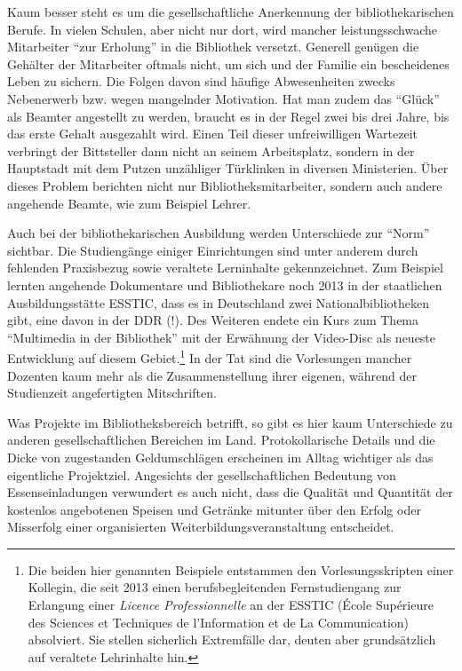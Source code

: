 \documentclass[a4paper,
fontsize=11pt,
oneside,
numbers=noperiodatend,
parskip=half-,
bibliography=totoc,
final
]{scrartcl}
\begin{document}
Kaum besser steht es um die gesellschaftliche Anerkennung der
bibliothekarischen Berufe. In vielen Schulen, aber nicht nur dort, wird
mancher leistungsschwache Mitarbeiter \enquote{zur Erholung} in die
Bibliothek versetzt. Generell genügen die Gehälter der Mitarbeiter
oftmals nicht, um sich und der Familie ein bescheidenes Leben zu
sichern. Die Folgen davon sind häufige Abwesenheiten zwecks Nebenerwerb
bzw. wegen mangelnder Motivation. Hat man zudem das \enquote{Glück} als
Beamter angestellt zu werden, braucht es in der Regel zwei bis drei
Jahre, bis das erste Gehalt ausgezahlt wird. Einen Teil dieser
unfreiwilligen Wartezeit verbringt der Bittsteller dann nicht an seinem
Arbeitsplatz, sondern in der Hauptstadt mit dem Putzen unzähliger
Türklinken in diversen Ministerien. Über dieses Problem berichten nicht
nur Bibliotheksmitarbeiter, sondern auch andere angehende Beamte, wie
zum Beispiel Lehrer.

Auch bei der bibliothekarischen Ausbildung werden Unterschiede zur
\enquote{Norm} sichtbar. Die Studiengänge einiger Einrichtungen sind
unter anderem durch fehlenden Praxisbezug sowie veraltete Lerninhalte
gekennzeichnet. Zum Beispiel lernten angehende Dokumentare und
Bibliothekare noch 2013 in der staatlichen Ausbildungsstätte ESSTIC,
dass es in Deutschland zwei Nationalbibliotheken gibt, eine davon in der
DDR (!). Des Weiteren endete ein Kurs zum Thema \enquote{Multimedia in
der Bibliothek} mit der Erwähnung der Video-Disc als neueste Entwicklung
auf diesem Gebiet.\footnote{Die beiden hier genannten Beispiele
  entstammen den Vorlesungsskripten einer Kollegin, die seit 2013 einen
  berufsbegleitenden Fernstudiengang zur Erlangung einer \emph{Licence
  Professionnelle} an der ESSTIC (École Supérieure des Sciences et
  Techniques de l'Information et de La Communication) absolviert. Sie
  stellen sicherlich Extremfälle dar, deuten aber grundsätzlich auf
  veraltete Lehrinhalte hin.} In der Tat sind die Vorlesungen mancher
Dozenten kaum mehr als die Zusammenstellung ihrer eigenen, während der
Studienzeit angefertigten Mitschriften.

Was Projekte im Bibliotheksbereich betrifft, so gibt es hier kaum
Unterschiede zu anderen gesellschaftlichen Bereichen im Land.
Protokollarische Details und die Dicke von zugestanden Geldumschlägen
erscheinen im Alltag wichtiger als das eigentliche Projektziel.
Angesichts der gesellschaftlichen Bedeutung von Essenseinladungen
verwundert es auch nicht, dass die Qualität und Quantität der kostenlos
angebotenen Speisen und Getränke mitunter über den Erfolg oder
Misserfolg einer organisierten Weiterbildungsveranstaltung entscheidet.
\end{document}
